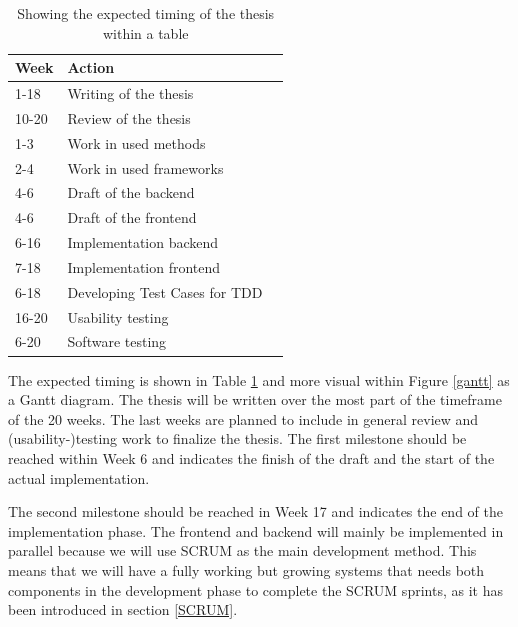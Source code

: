 \documentclass[a4page]{article}
\begin{document}
\begin{table}[h]
\centering%
\begin{tabular}{lll}
Week  		& 	Action				&  \\
\hline 
 1-18		&Writing of the thesis		&  \\
 10-20		& Review of the thesis		&  \\
 1-3			& Work in used methods		&  \\
  2-4 			& Work in used frameworks	&  \\ 				 	
  4-6			& Draft of the backend		&  \\ 
  4-6			& Draft of the frontend		& \\
  6-16		& Implementation backend	&  \\ 
  7-18		& Implementation frontend	&  \\ 
  6-18		& Developing Test Cases for TDD	&  \\ 
 16-20		& Usability testing				&  \\ 
 6-20		& Software testing				&  \\ 
\hline
\end{tabular}
\caption{Showing the expected timing of the thesis within a table}
\label{tgantt}
\end{table}

The expected timing is shown in Table \ref{tgantt} and more visual within Figure \ref{gantt} as a Gantt diagram. The thesis will be written over the most part of the timeframe of the 20 weeks. The last weeks are planned to include in general review and (usability-)testing work to finalize the thesis. The first milestone should be reached within Week 6 and indicates the finish of the draft and the start of the actual implementation. 

The second milestone should be reached in Week 17 and indicates the end of the implementation phase. The frontend and backend will mainly be implemented in parallel because we will use SCRUM as the main development method. This means that we will have a fully working but growing systems that needs both components in the development phase to complete the SCRUM sprints, as it has been introduced in section \ref{SCRUM}. 
\end{document}
